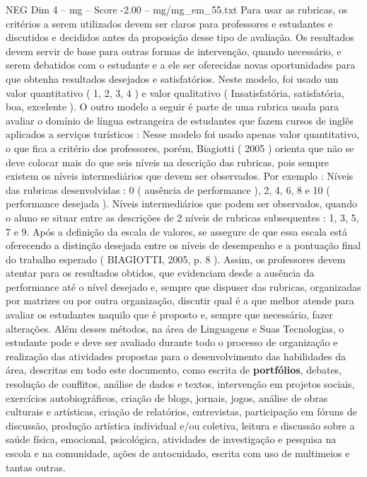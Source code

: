 \begin{textsample}{NEG Dim 4 – mg – Score -2.00 – mg/mg\_em\_55.txt}  \label{ex:f4_neg_097}
Para usar as rubricas, os critérios a serem utilizados devem ser claros para professores e estudantes e discutidos e decididos antes da proposição desse tipo de avaliação.
Os resultados devem servir de base para outras formas de intervenção, quando necessário, e serem debatidos com o estudante e a ele ser oferecidas novas oportunidades para que obtenha resultados desejados e satisfatórios.
Neste modelo, foi usado um valor quantitativo ( 1, 2, 3, 4 ) e valor qualitativo ( Insatisfatória, satisfatória, boa, excelente ).
O outro modelo a seguir é parte de uma rubrica usada para avaliar o domínio de língua estrangeira de estudantes que fazem cursos de inglês aplicados a serviços turísticos : Nesse modelo foi usado apenas valor quantitativo, o que fica a critério dos professores, porém, Biagiotti ( 2005 ) orienta que não se deve colocar mais do que seis níveis na descrição das rubricas, pois sempre existem os níveis intermediários que devem ser observados.
Por exemplo : Níveis das rubricas desenvolvidas : 0 ( ausência de performance ), 2, 4, 6, 8 e 10 ( performance desejada ).
Níveis intermediários que podem ser observados, quando o aluno se situar entre as descrições de 2 níveis de rubricas subsequentes : 1, 3, 5, 7 e 9.
Após a definição da escala de valores, se assegure de que essa escala está oferecendo a distinção desejada entre os níveis de desempenho e a pontuação final do trabalho esperado ( BIAGIOTTI, 2005, p. 8 ).
Assim, os professores devem atentar para os resultados obtidos, que evidenciam desde a ausência da performance até o nível desejado e, sempre que dispuser das rubricas, organizadas por matrizes ou por outra organização, discutir qual é a que melhor atende para avaliar os estudantes naquilo que é proposto e, sempre que necessário, fazer alterações.
Além desses métodos, na área de Linguagens e Suas Tecnologias, o estudante pode e deve ser avaliado durante todo o processo de organização e realização das atividades propostas para o desenvolvimento das habilidades da área, descritas em todo este documento, como escrita de \textbf{portfólios}, debates, resolução de conflitos, análise de dados e textos, intervenção em projetos sociais, exercícios autobiográficos, criação de blogs, jornais, jogos, análise de obras culturais e artísticas, criação de relatórios, entrevistas, participação em fóruns de discussão, produção artística individual e/ou coletiva, leitura e discussão sobre a saúde física, emocional, psicológica, atividades de investigação e pesquisa na escola e na comunidade, ações de autocuidado, escrita com uso de multimeios e tantas outras.

\end{textsample}
